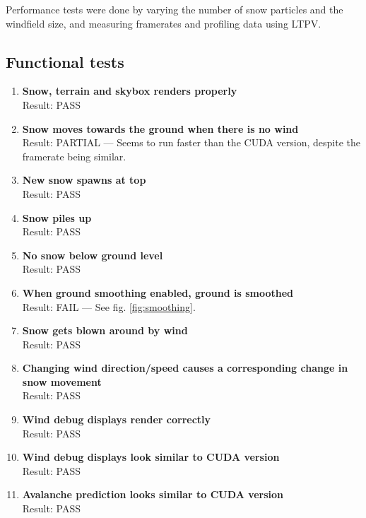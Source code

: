 Performance tests were done by varying the number of snow particles and the windfield size, and measuring framerates and profiling data using LTPV.

\subsection{Functional tests}
\begin{enumerate}
\item \textbf{Snow, terrain and skybox renders properly} \\ Result: PASS
\item \textbf{Snow moves towards the ground when there is no wind} \\ Result: PARTIAL --- Seems to run faster than the CUDA version, despite the framerate being similar.
\item \textbf{New snow spawns at top} \\ Result: PASS
\item \textbf{Snow piles up } \\ Result: PASS
\item \textbf{No snow below ground level} \\ Result: PASS
\item \textbf{When ground smoothing enabled, ground is smoothed} \\ Result: FAIL --- See fig. \ref{fig:smoothing}.
\item \textbf{Snow gets blown around by wind} \\ Result: PASS
\item \textbf{Changing wind direction/speed causes a corresponding change in snow movement} \\ Result: PASS
\item \textbf{Wind debug displays render correctly} \\ Result: PASS
\item \textbf{Wind debug displays look similar to CUDA version} \\ Result: PASS
\item \textbf{Avalanche prediction looks similar to CUDA version} \\ Result: PASS
\end{enumerate}

